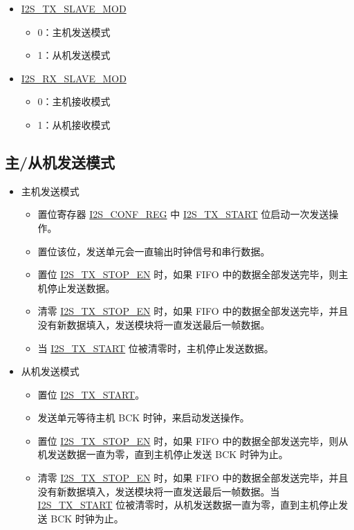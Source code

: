 \documentclass[main\_\_CN.tex]{subfiles}
\begin{document}
\begin{itemize}
    \item \hyperref[fielddesc:I2STXSLAVEMOD]{I2S\_TX\_SLAVE\_MOD}
    \begin{itemize}
        \item 0：主机发送模式
        \item 1：从机发送模式
    \end{itemize}
    \item \hyperref[fielddesc:I2SRXSLAVEMOD]{I2S\_RX\_SLAVE\_MOD}
    \begin{itemize}
        \item 0：主机接收模式
        \item 1：从机接收模式
    \end{itemize}
\end{itemize}

\subsection{主/从机发送模式} \label{subsubsection:master/slave_transmitting_mode}
\begin{itemize}
    \item 主机发送模式
    \begin{itemize}
        \item 置位寄存器 \hyperref[regdesc:I2SCONFREG]{I2S\_CONF\_REG} 中 \hyperref[fielddesc:I2STXSTART]{I2S\_TX\_START} 位启动一次发送操作。
        \item 置位该位，发送单元会一直输出时钟信号和串行数据。
        \item 置位 \hyperref[fielddesc:I2STXSTOPEN]{I2S\_TX\_STOP\_EN} 时，如果 FIFO 中的数据全部发送完毕，则主机停止发送数据。
        \item 清零 \hyperref[fielddesc:I2STXSTOPEN]{I2S\_TX\_STOP\_EN} 时，如果 FIFO 中的数据全部发送完毕，并且没有新数据填入，发送模块将一直发送最后一帧数据。
        \item 当 \hyperref[fielddesc:I2STXSTART]{I2S\_TX\_START} 位被清零时，主机停止发送数据。
    \end{itemize}
    \item 从机发送模式
     \begin{itemize}
        \item 置位 \hyperref[fielddesc:I2STXSTART]{I2S\_TX\_START}。
        \item 发送单元等待主机 BCK 时钟，来启动发送操作。
        \item 置位 \hyperref[fielddesc:I2STXSTOPEN]{I2S\_TX\_STOP\_EN} 时，如果 FIFO 中的数据全部发送完毕，则从机发送数据一直为零，直到主机停止发送 BCK 时钟为止。
        \item 清零 \hyperref[fielddesc:I2STXSTOPEN]{I2S\_TX\_STOP\_EN} 时，如果 FIFO 中的数据全部发送完毕，并且没有新数据填入，发送模块将一直发送最后一帧数据。当 \hyperref[fielddesc:I2STXSTART]{I2S\_TX\_START} 位被清零时，从机发送数据一直为零，直到主机停止发送 BCK 时钟为止。
    \end{itemize}
\end{itemize}
\end{document}
